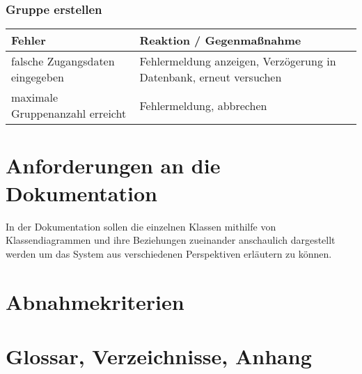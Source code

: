 \documentclass{article}
\begin{document}
\section{Gruppe erstellen}
\begin{tabular}{|p{7cm}|p{7cm}|}
\hline
	\textbf{Fehler}					&	\textbf{Reaktion / Gegenmaßnahme}									\\
\hline
\hline
	falsche Zugangsdaten eingegeben	&	Fehlermeldung anzeigen, Verzögerung in Datenbank, erneut versuchen	\\
\hline
	maximale Gruppenanzahl erreicht	&	Fehlermeldung, abbrechen											\\
\hline
\end{tabular}

\newpage
\part{Anforderungen an die Dokumentation}
In der Dokumentation sollen die einzelnen Klassen mithilfe von Klassendiagrammen
und ihre Beziehungen zueinander anschaulich dargestellt werden um das System aus
verschiedenen Perspektiven erläutern zu können.

\newpage
\part{Abnahmekriterien}


\newpage
\part{Glossar, Verzeichnisse, Anhang}
\end{document}
